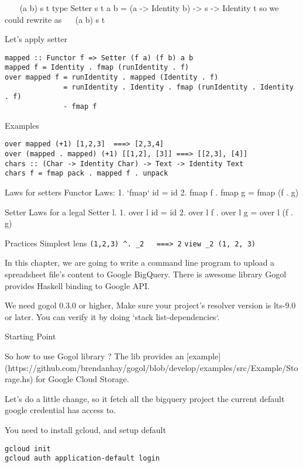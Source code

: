 ~\hs{::}~~\hs{->} (a \hs{->} b) \hs{->} s \hs{->} t
type Setter s t a b = (a -> Identity b) -> s -> Identity t
so we could rewrite  as
~\hs{::}~ \hs{->} (a \hs{->} b) \hs{->} s \hs{->} t

Let’s apply setter

\begin{verbatim}
mapped :: Functor f => Setter (f a) (f b) a b
mapped f = Identity . fmap (runIdentity . f)
over mapped f = runIdentity . mapped (Identity . f)
              = runIdentity . Identity . fmap (runIdentity . Identity . f)
              - fmap f
\end{verbatim}

Examples

\begin{verbatim}
over mapped (+1) [1,2,3]  ===> [2,3,4]
over (mapped . mapped) (+1) [[1,2], [3]] ===> [[2,3], [4]]
chars :: (Char -> Identity Char) -> Text -> Identity Text
chars f = fmap pack . mapped f . unpack
\end{verbatim}

Laws for setters
Functor Laws:
1. `fmap` id = id
2. fmap f . fmap g = fmap (f . g)

Setter Laws for a legal Setter l.
1. over l id = id
2. over l f . over l g = over l (f . g)


Practices
Simplest lens
\verb|(1,2,3) ^. _2   ===> 2|
\verb|view _2 (1, 2, 3)|



In this chapter, we are going to write a command line program to upload a spreadsheet file's content to Google BigQuery. There is awesome library Gogol provides Haskell binding to Google API.



We need gogol 0.3.0 or higher, Make sure your project's resolver version is lts-9.0 or later. You can verify it by doing `stack list-dependencies`.

Starting Point

So how to use Gogol library ? The lib provides an [example](https://github.com/brendanhay/gogol/blob/develop/examples/src/Example/Storage.hs) for Google Cloud Storage.

Let's do a little change, so it fetch all the bigquery project the current default google credential has access to.

You need to install gcloud, and setup default
\begin{verbatim}
gcloud init
gcloud auth application-default login
\end{verbatim}

